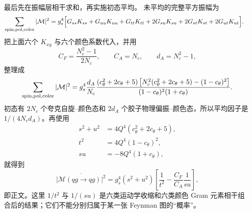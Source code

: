 \begin{derivation}[夸克与胶子散射的通道求和]
最后先在振幅层相干求和，再实施初态平均。
未平均的完整平方振幅为
\begin{align*}
 \sum_{\rm spin,pol,color}|\mathcal M|^2
 =g_s^4\Bigl[&
 G_{ss}K_{ss}+G_{uu}K_{uu}+G_{tt}K_{tt}
 +2G_{su}K_{su}+2G_{st}K_{st}+2G_{ut}K_{ut}
 \Bigr].
\end{align*}
把上面六个 $K_{xy}$ 与六个颜色系数代入，并用
\begin{equation*}
 C_F=\frac{N_c^2-1}{2N_c},
 \qquad C_A=N_c,
 \qquad d_A=N_c^2-1,
\end{equation*}
整理成
\begin{equation*}
 \sum_{\rm spin,pol,color}|\mathcal M|^2
 =g_s^4\frac{d_A}{N_c}
 \frac{(c_\theta^2+2c_\theta+5)
 \left[N_c^2(c_\theta^2+2c_\theta+5)-(1-c_\theta)^2\right]}
 {(1-c_\theta)^2(1+c_\theta)}.
\end{equation*}
初态有 $2N_c$ 个夸克自旋--颜色态和 $2d_A$ 个胶子物理偏振--颜色态，所以平均因子是 $1/(4N_cd_A)$。再使用
\begin{align*}
 s^2+u^2&=4Q^4(c_\theta^2+2c_\theta+5),\\
 t^2&=4Q^4(1-c_\theta)^2,\\
 su&=-8Q^4(1+c_\theta),
\end{align*}
就得到
\begin{equation*}
 \overline{|\mathcal M(qg\to qg)|^2}
 =g_s^4(s^2+u^2)
 \left[
 \frac1{t^2}-\frac{C_F}{C_A}\frac1{su}
 \right],
\end{equation*}
即正文。这里 $1/t^2$ 与 $1/(su)$ 是六类运动学收缩和六类颜色 Gram 元素相干组合后的结果；它们不能分别归属于某一张 Feynman 图的“概率”。
\end{derivation}


